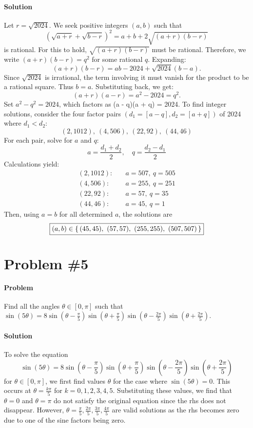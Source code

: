 \documentclass[10pt]{article}
\theoremstyle{plain}
\theoremstyle{definition}
\theoremstyle{remark}
\begin{document}
\paragraph{Solution}
Let $r=\sqrt{2024}$. We seek positive integers $(a,b)$ such that
\[
\left(\sqrt{a+r}+\sqrt{b-r}\right)^2 = a+b+2\sqrt{(a+r)(b-r)}
\]
is rational. For this to hold, $\sqrt{(a+r)(b-r)}$ must be rational. Therefore, we write $(a+r)(b-r)=q^2$ for some rational $q$. Expanding:
\[
(a+r)(b-r)=ab - 2024 + \sqrt{2024}(b - a).
\]
Since $\sqrt{2024}$ is irrational, the term involving it must vanish for the product to be a rational square. Thus $b=a$. Substituting back, we get:
\[
(a+r)(a-r) = a^2 - 2024 = q^2.
\]
Set \(a^2 - q^2 = 2024\), which factors as (a - q)(a + q) = 2024.
To find integer solutions, consider the four factor pairs \((d_1=[a-q], d_2=[a+q])\) of 2024 where \(d_1 < d_2\):
\[
(2, 1012),\ (4, 506),\ (22, 92),\ (44, 46)
\]
For each pair, solve for \(a\) and \(q\):
\[
a = \frac{d_1 + d_2}{2}, \quad q = \frac{d_2 - d_1}{2}
\]
Calculations yield:
\begin{align*}
(2, 1012): &\quad a = 507,\ q = 505 \\
(4, 506): &\quad a = 255,\ q = 251 \\
(22, 92): &\quad a = 57,\ q = 35 \\
(44, 46): &\quad a = 45,\ q = 1
\end{align*}
Then, using \(a=b\) for all determined \(a\), the solutions are
\[
\fbox{\((a,b)\in\{\,(45,45),\ (57,57),\ (255,255),\ (507,507) \,\}\)}
\]

\section{Problem \#5}

\paragraph{Problem} Find all the angles \(\theta \in[0,\pi]\) such that \(\sin(5\theta)=8\sin(\theta-\frac{\pi}{5})\sin(\theta+\frac{\pi}{5})\sin(\theta-\frac{2\pi}{5})\sin(\theta+\frac{2\pi}{5})\).

\paragraph{Solution} To solve the equation 
\[
\sin(5\theta) = 8\sin\left(\theta-\frac{\pi}{5}\right)\sin\left(\theta+\frac{\pi}{5}\right)\sin\left(\theta-\frac{2\pi}{5}\right)\sin\left(\theta+\frac{2\pi}{5}\right)
\]
for \(\theta \in [0, \pi]\), we first find values \(\theta\) for the case where \(\sin(5\theta) = 0\). This occurs at \(\theta = \frac{k\pi}{5}\) for \(k = 0, 1, 2, 3, 4, 5\). Substituting these values, we find that \(\theta = 0\) and \(\theta = \pi\) do not satisfy the original equation since the rhs does not disappear. However, \(\theta = \frac{\pi}{5}, \frac{2\pi}{5}, \frac{3\pi}{5}, \frac{4\pi}{5}\) are valid solutions as the rhs becomes zero due to one of the sine factors being zero.
\end{document}

